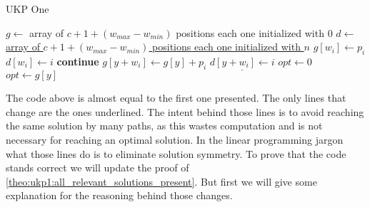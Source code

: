 \documentclass[12pt]{article}
\begin{document}
\begin{algorithm}
\caption{UKP One}\label{alg:ukp1}
\begin{algorithmic}[1]
  \State \(g \gets\) array of \(c + 1 + (w_{max} - w_{min})\) positions each one initialized with \(0\)\label{ukp1:create_g}
  \State \underline{\(d \gets\) array of \(c + 1 + (w_{max} - w_{min})\) positions each one initialized with \(n\)\label{ukp1:create_d}}
  \State %
  \label{begin_trivial_bounds}
      \State \(g[w_i] \gets p_i\)
      \State \underline{\(d[w_i] \gets i\)}
    \EndIf
  \EndFor\label{end_trivial_bounds}
  \State %
  \label{ukp1:main_ext_loop_begin}
    \label{ukp1:if_equal_to_zero}
    	\State \textbf{continue}
    \EndIf\label{ukp1:if_equal_to_zero}
    \State %
    \label{ukp1:main_inner_loop_begin}
      \label{ukp1:if_better_solution_begin}
        \State \(g[y + w_i] \gets g[y] + p_i\)
        \State \(\underline{d[y + w_i] \gets i}\)
      \EndIf\label{ukp1:if_better_solution_end}
    \EndFor\label{ukp1:main_inner_loop_end}
  \EndFor\label{ukp1:main_ext_loop_end}
  \State %
  \State \(opt \gets 0\)
  \label{ukp1:get_opt_loop_begin}
    \label{ukp1:opt_loop_if}
      \State \(opt \gets g[y]\)
    \EndIf
  \EndFor\label{ukp1:get_opt_loop_end}
\EndProcedure
\end{algorithmic}
\end{algorithm}

The code above is almost equal to the first one presented. The only lines that change are the ones underlined. The intent behind those lines is to avoid reaching the same solution by many paths, as this wastes computation and is not necessary for reaching an optimal solution. In the linear programming jargon what those lines do is to eliminate solution symmetry. To prove that the code stands correct we will update the proof of \ref{theo:ukp1:all_relevant_solutions_present}. But first we will give some explanation for the reasoning behind those changes.
\end{document}
